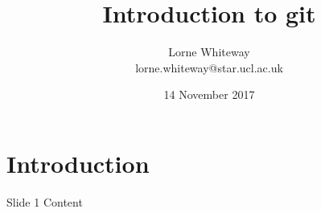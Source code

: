 \documentclass{beamer}
\title[Introduction to git] %
{Introduction to git}
\author{Lorne Whiteway \\ lorne.whiteway@star.ucl.ac.uk}
\date{14 November 2017}
\begin{document}

\begin{frame}
  \titlepage
\end{frame}

\section{Introduction}

\begin{frame}{Slide 1}
Content
\end{frame}
\end{document}
